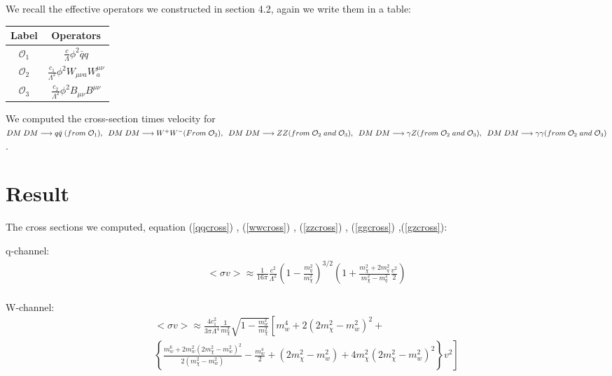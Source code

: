 \documentclass[12pt]{report}
\begin{document}
 
 We recall the effective operators we constructed in section 4.2, again we write them in a table:
 
 \begin{center}
\begin{tabular}{|c|c|}
\hline
Label & Operators\\ \hline
$\mathcal{O}_1$ & $\frac{c}{\Lambda} \phi^2 \bar{q}q$\\ \hline
$\mathcal{O}_2$ & $\frac{c_1}{\Lambda^2} \phi^2 W_{\mu \nu a} W^{\mu \nu}_a$ \\ \hline

$\mathcal{O}_3$ & $\frac{c_2}{\Lambda^2} \phi^2 B_{\mu \nu} B^{\mu \nu}$\\ \hline
\end{tabular}
\end{center}

We computed the cross-section times velocity for $ DM\;DM \longrightarrow q \bar{q}\; (from\; \mathcal{O}_1),\\ \; \; DM\; DM \longrightarrow W^+W^-(From\; \mathcal{O}_2), \; \;
DM\; DM \longrightarrow ZZ (from\; \mathcal{O}_2 \; and\; \mathcal{O}_3 ),\\ \; \; DM\; DM \longrightarrow \gamma Z (from\; \mathcal{O}_2 \; and\; \mathcal{O}_3 ) , \; \; DM\; DM \longrightarrow \gamma  \gamma (from\; \mathcal{O}_2  \; and\; \mathcal{O}_3 )$. 


\section{Result}

The cross sections we computed, equation (\ref{qqcross}) , (\ref{wwcross}) , (\ref{zzcross}) , (\ref{ggcross}) ,(\ref{gzcross}):






q-channel:
\begin{align}
<\sigma v > \approx \frac{1}{16 \pi} \frac{c^2}{\Lambda^2} (1-\frac{m_q^2}{m_\chi^2})^{3/2} 
\left(1+ \frac{m_\chi^2 +2m_q^2}{m_\chi^2-m_q^2} \frac{v^2}{2}\right)
\end{align}\\

W-channel:
\begin{multline}
<\sigma v> \approx \frac{4c^2_1}{3 \pi \Lambda^4}  \frac{1}{m^2_\chi}  \sqrt{1-\frac{m^2_w}{m^2_\chi}} \left[ m^4_w + 2(2 m^2_\chi -m^2_w)^2 + \right. \\
\left. \left\{ \frac{ m^6_w+2 m^2_w (2 m^2_\chi - m^2_w)^2 }{2(m^2_\chi - m^2_w)} -\frac{m^4_w}{2} + (2 m^2_\chi - m^2_w) + 4 m^2_\chi (2 m^2_\chi - m^2_w)^2 \right\} v^2  \right] 
\end{multline}\\
\end{document}
